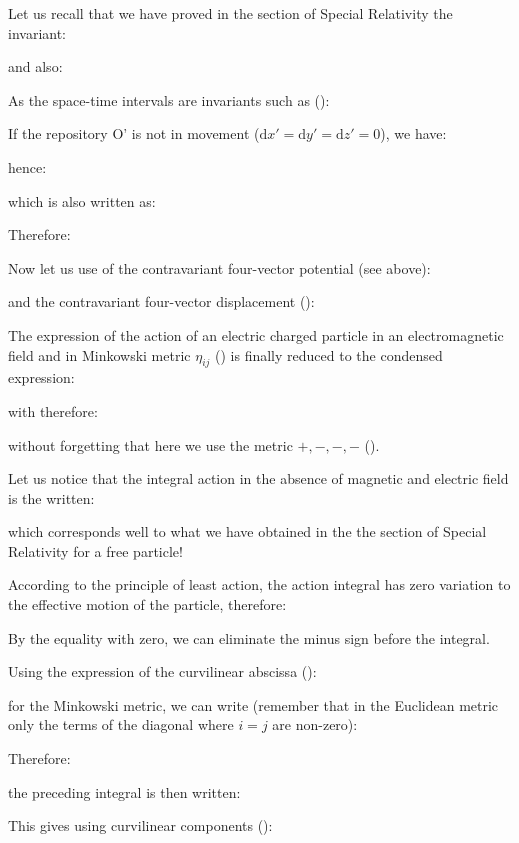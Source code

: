 	Let us recall that we have proved in the section of Special Relativity the invariant:
	
	and also:
	
	As the space-time intervals are invariants such as ():
	
	If the repository O' is not in movement ($\mathrm{d}x'=\mathrm{d}y'=\mathrm{d}z'=0$), we have:
	
	hence:
	
	which is also written as:
	
	Therefore:
	
	Now let us use of the contravariant four-vector potential (see above):
	
	and the contravariant four-vector displacement ():
	
	The expression of the action of an electric charged particle in an electromagnetic field and in Minkowski metric $\eta_{ij}$ () is finally reduced to the condensed expression:
	
	with therefore:
	
	without forgetting that here we use the metric $+, -, -, -$ ().
	
	Let us notice that the integral action in the absence of magnetic and electric field is the written:
	
	which corresponds well to what we have obtained in the the section of Special Relativity for a free particle!

	According to the principle of least action, the action integral has zero variation to the effective motion of the particle, therefore:
	
	\begin{tcolorbox}[title=Remark,colframe=black,arc=10pt]
	By the equality with zero, we can eliminate the minus sign before the integral.
	\end{tcolorbox}
	Using the expression of the curvilinear abscissa ():
	
	for the Minkowski metric, we can write (remember that in the Euclidean metric only the terms of the diagonal where $i=j$ are non-zero):
	
	Therefore:
	
	the preceding integral is then written:
	
	This gives using curvilinear components ():
	
